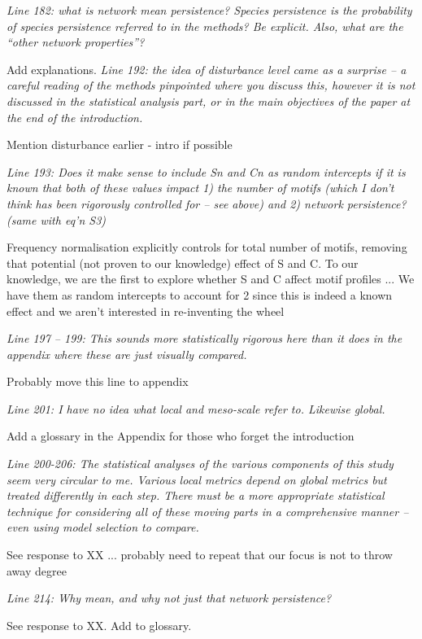 \documentclass[12pt]{article}
\newcommand{\us}{\rm \setlength{\leftskip}{0.3cm} \setlength{\rightskip}{0.3cm}}
\newcommand{\them}{\it \setlength{\leftskip}{0cm} \setlength{\rightskip}{0cm}}
\begin{document}
\them
Line 182: what is network mean persistence? Species persistence is the probability of species persistence referred to in the methods? Be explicit. Also, what are the “other network properties”?

\us
Add explanations.
\them
Line 192: the idea of disturbance level came as a surprise – a careful reading of the methods pinpointed where you discuss this, however it is not discussed in the statistical analysis part, or in the main objectives of the paper at the end of the introduction.

\us Mention disturbance earlier - intro if possible

\them
Line 193: Does it make sense to include Sn and Cn as random intercepts if it is known that both of these values impact 1) the number of motifs (which I don’t think has been rigorously controlled for – see above) and 2) network persistence? (same with eq’n S3)

\us Frequency normalisation explicitly controls for total number of motifs, removing that potential (not proven to our knowledge) effect of S and C. To our knowledge, we are the first to explore whether S and C affect motif profiles ... 
We have them as random intercepts to account for 2 since this is indeed a known effect and we aren't interested in re-inventing the wheel

\them
Line 197 – 199: This sounds more statistically rigorous here than it does in the appendix where these are just visually compared.

\us Probably move this line to appendix

\them
Line 201: I have no idea what local and meso-scale refer to. Likewise global.

\us Add a glossary in the Appendix for those who forget the introduction

\them
Line 200-206: The statistical analyses of the various components of this study seem very circular to me. Various local metrics depend on global metrics but treated differently in each step. There must be a more appropriate statistical technique for considering all of these moving parts in a comprehensive manner – even using model selection to compare.

\us See response to XX ... probably need to repeat that our focus is not to throw away degree

\them
Line 214: Why mean, and why not just that network persistence?

\us See response to XX. Add to glossary.
\end{document}

